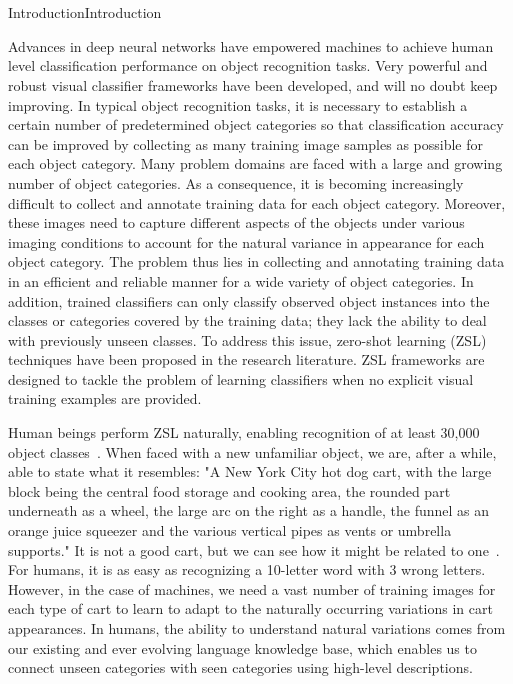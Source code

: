 \chapter{}{Introduction}{Introduction}

Advances in deep neural networks have empowered machines to achieve human level classification performance on object recognition tasks. Very powerful and robust visual classifier frameworks have been developed, and will no doubt keep improving. In typical object recognition tasks, it is necessary to establish a certain number of predetermined object categories so that classification accuracy can be improved by collecting as many training image samples as possible for each object category. Many problem domains are faced with a large and growing number of object categories. As a consequence, it is becoming increasingly difficult to collect and annotate training data for each object category. Moreover, these images need to capture different aspects of the objects under various imaging conditions to account for the natural variance in appearance for each object category. The problem thus lies in collecting and annotating training data in an efficient and reliable manner for a wide variety of object categories. In addition, trained classifiers can only classify observed object instances into the classes or categories covered by the training data; they lack the ability to deal with previously unseen classes. To address this issue, zero-shot learning (ZSL) techniques have been proposed in the research literature. ZSL frameworks are designed to  tackle the problem of learning classifiers when no explicit visual training examples are provided.

\par
\medskip

Human beings perform ZSL naturally, enabling recognition of at least 30,000 object classes~\cite{humanimageunderstanding}. When faced with a new unfamiliar object, we are, after a while, able to state what it resembles: "A New York City hot dog cart, with the large block being the central food storage and cooking area, the rounded part underneath as a wheel, the large arc on the right as a handle, the funnel as an orange juice squeezer and the various vertical pipes as vents or umbrella supports." It is not a good cart, but we can see how it might be related to one~\cite{humanimageunderstanding}. For humans, it is as easy as recognizing a 10-letter word with 3 wrong letters. However, in the case of machines, we need a vast number of training images for each type of cart to learn to adapt to the naturally occurring variations in cart appearances. In humans, the ability to understand natural variations comes from our existing and ever evolving language knowledge base, which enables us to connect unseen categories with seen categories using high-level descriptions.

